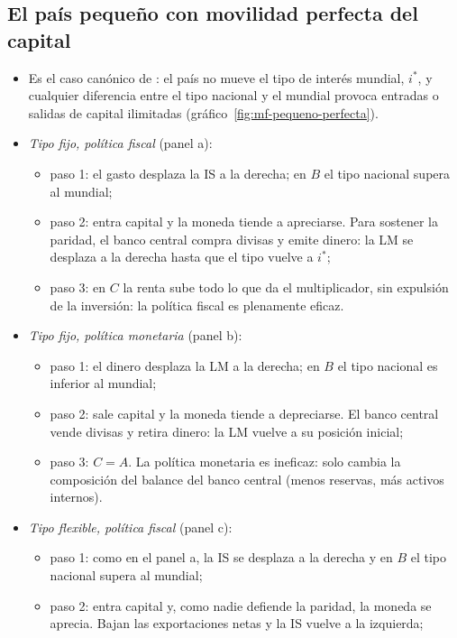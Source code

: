 \documentclass[11pt]{article}
\begin{document}
\subsection*{El país pequeño con movilidad perfecta del capital}

\begin{itemize}
\item Es el caso canónico de \textcite{Mundell1963Capital}: el país no mueve el tipo de interés mundial, $i^*$, y cualquier diferencia entre el tipo nacional y el mundial provoca entradas o salidas de capital ilimitadas (gráfico~\ref{fig:mf-pequeno-perfecta}).
\item \emph{Tipo fijo, política fiscal} (panel a):
  \begin{itemize}
  \item paso 1: el gasto desplaza la IS a la derecha; en $B$ el tipo nacional supera al mundial;
  \item paso 2: entra capital y la moneda tiende a apreciarse. Para sostener la paridad, el banco central compra divisas y emite dinero: la LM se desplaza a la derecha hasta que el tipo vuelve a $i^*$;
  \item paso 3: en $C$ la renta sube todo lo que da el multiplicador, sin expulsión de la inversión: la política fiscal es plenamente eficaz.
  \end{itemize}
\item \emph{Tipo fijo, política monetaria} (panel b):
  \begin{itemize}
  \item paso 1: el dinero desplaza la LM a la derecha; en $B$ el tipo nacional es inferior al mundial;
  \item paso 2: sale capital y la moneda tiende a depreciarse. El banco central vende divisas y retira dinero: la LM vuelve a su posición inicial;
  \item paso 3: $C=A$. La política monetaria es ineficaz: solo cambia la composición del balance del banco central (menos reservas, más activos internos).
  \end{itemize}
\item \emph{Tipo flexible, política fiscal} (panel c):
  \begin{itemize}
  \item paso 1: como en el panel a, la IS se desplaza a la derecha y en $B$ el tipo nacional supera al mundial;
  \item paso 2: entra capital y, como nadie defiende la paridad, la moneda se aprecia. Bajan las exportaciones netas y la IS vuelve a la izquierda;

\end{itemize}
\end{itemize}
\end{document}
